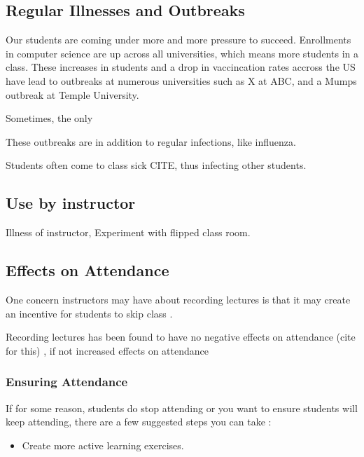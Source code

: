 \documentclass[sigconf]{acmart}
\begin{document}
\subsection{Regular Illnesses and Outbreaks}
Our students are coming under more and more pressure to succeed.  
Enrollments in computer science are up across all universities, which means more students in a class. 
These increases in students and a drop in vaccincation rates accross the US have lead to outbreaks at numerous universities such as X at ABC, and a Mumps outbreak at Temple University.

Sometimes, the only 

These outbreaks are in addition to regular infections, like influenza. 

Students often come to class sick CITE, thus infecting other students.




\subsection{Use by instructor}
Illness of instructor, 
Experiment with flipped class room.


\subsection{Effects on Attendance}
One concern instructors may have about recording lectures is that it may create an incentive for students to skip class \cite{larkin2010but}.




Recording lectures has been found to have no negative effects on attendance (cite for this) \cite{shimoff2001effects}, if not increased effects on attendance \cite{shimoff2001effects}

\subsubsection{Ensuring Attendance}
If for some reason, students do stop attending or you want to ensure students will keep attending, there are a few suggested steps you can take \cite{larkin2010but}:
\begin{itemize}
	\item Create more active learning exercises.
\end{itemize}
\end{document}
